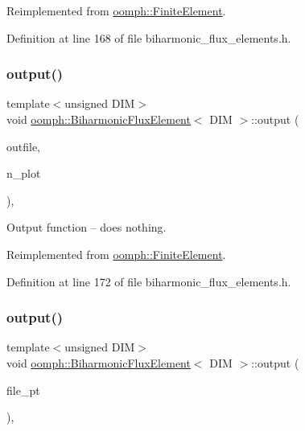 Reimplemented from \hyperlink{classoomph_1_1FiniteElement_a2ad98a3d2ef4999f1bef62c0ff13f2a7}{oomph\+::\+Finite\+Element}.



Definition at line 168 of file biharmonic\+\_\+flux\+\_\+elements.\+h.

\mbox{\label{classoomph_1_1BiharmonicFluxElement_a6fe872f8689f493bbcd2f251106284dd}} 
\subsubsection{\texorpdfstring{output()}{output()}\hspace{0.1cm}{\footnotesize\ttfamily [2/4]}}
{\footnotesize\ttfamily template$<$unsigned D\+IM$>$ \\
void \hyperlink{classoomph_1_1BiharmonicFluxElement}{oomph\+::\+Biharmonic\+Flux\+Element}$<$ D\+IM $>$\+::output (\begin{DoxyParamCaption}\item[{std\+::ostream \&}]{outfile,  }\item[{const unsigned \&}]{n\+\_\+plot }\end{DoxyParamCaption})\hspace{0.3cm}{\ttfamily [inline]}, {\ttfamily [virtual]}}



Output function -- does nothing. 



Reimplemented from \hyperlink{classoomph_1_1FiniteElement_afa9d9b2670f999b43e6679c9dd28c457}{oomph\+::\+Finite\+Element}.



Definition at line 172 of file biharmonic\+\_\+flux\+\_\+elements.\+h.

\mbox{\label{classoomph_1_1BiharmonicFluxElement_a8cb3a9fb35eb58eff73bd8f0f96baf05}} 
\subsubsection{\texorpdfstring{output()}{output()}\hspace{0.1cm}{\footnotesize\ttfamily [3/4]}}
{\footnotesize\ttfamily template$<$unsigned D\+IM$>$ \\
void \hyperlink{classoomph_1_1BiharmonicFluxElement}{oomph\+::\+Biharmonic\+Flux\+Element}$<$ D\+IM $>$\+::output (\begin{DoxyParamCaption}\item[{F\+I\+LE $\ast$}]{file\+\_\+pt }\end{DoxyParamCaption})\hspace{0.3cm}{\ttfamily [inline]}, {\ttfamily [virtual]}}



